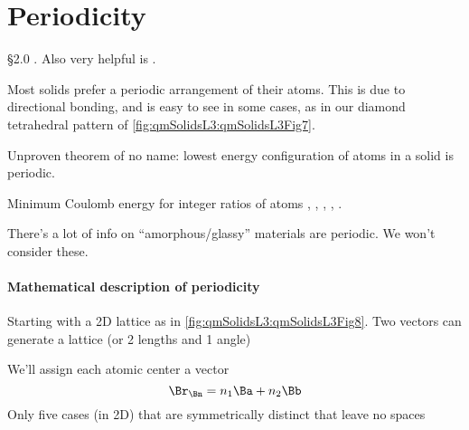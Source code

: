%
%

\section{Periodicity}

\reading \S 2.0 \citep{ibach2009solid}.  Also very helpful is \citep{tung:bravais}.

Most solids prefer a periodic arrangement of their atoms.  This is due to directional bonding, and is easy to see in some cases, as in our diamond tetrahedral pattern of \cref{fig:qmSolidsL3:qmSolidsL3Fig7}.
%

Unproven theorem of no name: lowest energy configuration of atoms in a solid is periodic.

Minimum Coulomb energy for integer ratios of atoms
,
,
,
,
.

There's a lot of info on ``amorphous/glassy'' materials are  periodic.  We won't consider these.

\paragraph{Mathematical description of periodicity}

Starting with a 2D lattice as in \cref{fig:qmSolidsL3:qmSolidsL3Fig8}.  Two vectors can generate a lattice (or 2 lengths and 1 angle)
%

We'll assign each atomic center a vector
%
\begin{dmath}\label{eqn:condensedMatterLecture3:100}
\Br_\Bn = n_1 \Ba + n_2 \Bb
\end{dmath}
%
Only five cases (in 2D) that are symmetrically distinct that leave no spaces


